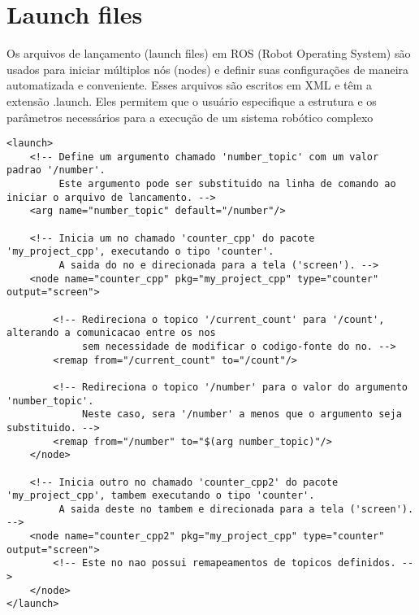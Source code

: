 \documentclass[letterpaper]{article}
\begin{document}
\section{Launch files}
Os arquivos de lançamento (launch files) em ROS (Robot Operating System) são usados para iniciar múltiplos nós (nodes) e definir suas configurações de maneira automatizada e conveniente. Esses arquivos são escritos em XML e têm a extensão .launch. Eles permitem que o usuário especifique a estrutura e os parâmetros necessários para a execução de um sistema robótico complexo
\begin{lstlisting}[style=xmlStyle, title=counter\_cpp.launch] 
<launch>
    <!-- Define um argumento chamado 'number_topic' com um valor padrao '/number'. 
         Este argumento pode ser substituido na linha de comando ao iniciar o arquivo de lancamento. -->
    <arg name="number_topic" default="/number"/>
    
    <!-- Inicia um no chamado 'counter_cpp' do pacote 'my_project_cpp', executando o tipo 'counter'.
         A saida do no e direcionada para a tela ('screen'). -->
    <node name="counter_cpp" pkg="my_project_cpp" type="counter" output="screen">   
        
        <!-- Redireciona o topico '/current_count' para '/count', alterando a comunicacao entre os nos
             sem necessidade de modificar o codigo-fonte do no. -->
        <remap from="/current_count" to="/count"/>
        
        <!-- Redireciona o topico '/number' para o valor do argumento 'number_topic'. 
             Neste caso, sera '/number' a menos que o argumento seja substituido. -->
        <remap from="/number" to="$(arg number_topic)"/>
    </node> 

    <!-- Inicia outro no chamado 'counter_cpp2' do pacote 'my_project_cpp', tambem executando o tipo 'counter'.
         A saida deste no tambem e direcionada para a tela ('screen'). -->
    <node name="counter_cpp2" pkg="my_project_cpp" type="counter" output="screen">   
        <!-- Este no nao possui remapeamentos de topicos definidos. -->
    </node> 
</launch>
\end{lstlisting}
\end{document}
